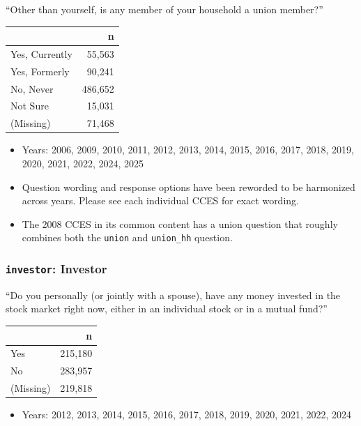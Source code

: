 \documentclass[10pt,article,oneside]{memoir}
\begin{document}
``Other than yourself, is any member of your household a union member?''

\begin{table}[H]
\centering
\begin{tabular}[t]{lr}
\toprule
 & n\\
\midrule
Yes, Currently & 55,563\\
Yes, Formerly & 90,241\\
No, Never & 486,652\\
Not Sure & 15,031\\
(Missing) & 71,468\\
\bottomrule
\end{tabular}
\end{table}

\begin{itemize}
\tightlist
\item
  Years: 2006, 2009, 2010, 2011, 2012, 2013, 2014, 2015, 2016, 2017,
  2018, 2019, 2020, 2021, 2022, 2024, 2025
\item
  Question wording and response options have been reworded to be
  harmonized across years. Please see each individual CCES for exact
  wording.
\item
  The 2008 CCES in its common content has a union question that roughly
  combines both the \texttt{union} and \texttt{union\_hh} question.
\end{itemize}

\subsubsection{\texorpdfstring{\texttt{investor}:
Investor}{investor: Investor}}\label{investor-investor}

``Do you personally (or jointly with a spouse), have any money invested
in the stock market right now, either in an individual stock or in a
mutual fund?''

\begin{table}[H]
\centering
\begin{tabular}[t]{lr}
\toprule
 & n\\
\midrule
Yes & 215,180\\
No & 283,957\\
(Missing) & 219,818\\
\bottomrule
\end{tabular}
\end{table}

\begin{itemize}
\tightlist
\item
  Years: 2012, 2013, 2014, 2015, 2016, 2017, 2018, 2019, 2020, 2021,
  2022, 2024
\end{itemize}
\end{document}
